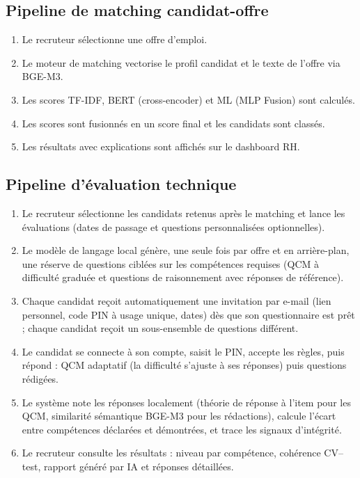 \documentclass[12pt,a4paper]{report}
\begin{document}
\subsection{Pipeline de matching candidat-offre}

\begin{enumerate}
  \item Le recruteur sélectionne une offre d'emploi.
  \item Le moteur de matching vectorise le profil candidat et le texte de l'offre via BGE-M3.
  \item Les scores TF-IDF, BERT (cross-encoder) et ML (MLP Fusion) sont calculés.
  \item Les scores sont fusionnés en un score final et les candidats sont classés.
  \item Les résultats avec explications sont affichés sur le dashboard RH.
\end{enumerate}

\subsection{Pipeline d'évaluation technique}

\begin{enumerate}
  \item Le recruteur sélectionne les candidats retenus après le matching et lance les évaluations (dates de passage et questions personnalisées optionnelles).
  \item Le modèle de langage local génère, une seule fois par offre et en arrière-plan, une réserve de questions ciblées sur les compétences requises (QCM à difficulté graduée et questions de raisonnement avec réponses de référence).
  \item Chaque candidat reçoit automatiquement une invitation par e-mail (lien personnel, code PIN à usage unique, dates) dès que son questionnaire est prêt ; chaque candidat reçoit un sous-ensemble de questions différent.
  \item Le candidat se connecte à son compte, saisit le PIN, accepte les règles, puis répond : QCM adaptatif (la difficulté s'ajuste à ses réponses) puis questions rédigées.
  \item Le système note les réponses localement (théorie de réponse à l'item pour les QCM, similarité sémantique BGE-M3 pour les rédactions), calcule l'écart entre compétences déclarées et démontrées, et trace les signaux d'intégrité.
  \item Le recruteur consulte les résultats : niveau par compétence, cohérence CV--test, rapport généré par IA et réponses détaillées.
\end{enumerate}
\end{document}
